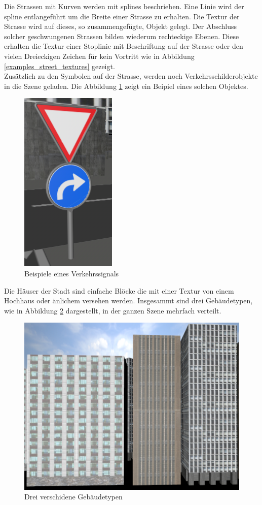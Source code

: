 Die Strassen mit Kurven werden mit \glspl{spline} beschrieben. Eine Linie wird der \gls{spline} entlangeführt um die Breite einer Strasse zu erhalten. Die Textur der Strasse wird auf dieses, so zusammengefügte, Objekt gelegt. Der Abschluss solcher geschwungenen Strassen bilden wiederum rechteckige Ebenen. Diese erhalten die Textur einer Stoplinie mit Beschriftung auf der Strasse oder den vielen Dreieckigen Zeichen für kein Vortritt wie in Abbildung \ref{examples_street_textures} gezeigt. \\
Zusätzlich zu den Symbolen auf der Strasse, werden noch Verkehrsschilderobjekte in die Szene geladen. Die Abbildung \ref{screenshot_trafficsignal} zeigt ein Beipiel eines solchen Objektes. 
\begin{figure}[htbp]
\centering 
\includegraphics[scale=0.6]{src/screenshot_trafficsignal.png}
\caption{Beispiele eines Verkehrssignals} %
\label{screenshot_trafficsignal} %
\end{figure}

Die Häuser der Stadt sind einfache Blöcke die mit einer Textur von einem Hochhaus oder änlichem versehen werden. Insgesammt sind drei Gebäudetypen, wie in Abbildung \ref{screenshot_buildings} dargestellt,  in der ganzen Szene mehrfach verteilt.
\begin{figure}[htbp]
\centering 
\includegraphics[scale=0.4]{src/screenshot_buildings.png}
\caption{Drei verschidene Gebäudetypen} %
\label{screenshot_buildings} %
\end{figure}
